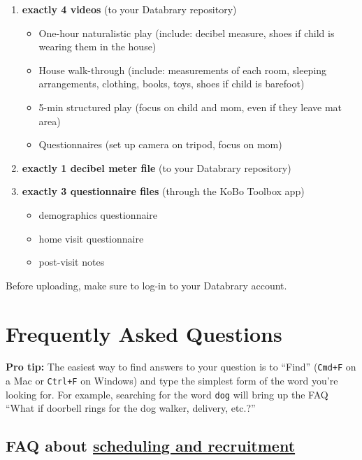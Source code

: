 \documentclass[
  12pt,
]{book}
\providecommand{\tightlist}{%
  \setlength{\itemsep}{0pt}\setlength{\parskip}{0pt}}
\begin{document}
\begin{enumerate}
\def\labelenumi{\arabic{enumi}.}
\tightlist
\item
  \textbf{exactly 4 videos} (to your Databrary repository)

  \begin{itemize}
  \tightlist
  \item
    One-hour naturalistic play (include: decibel measure, shoes if child is wearing them in the house)
  \item
    House walk-through (include: measurements of each room, sleeping arrangements, clothing, books, toys, shoes if child is barefoot)
  \item
    5-min structured play (focus on child and mom, even if they leave mat area)
  \item
    Questionnaires (set up camera on tripod, focus on mom)
  \end{itemize}
\item
  \textbf{exactly 1 decibel meter file} (to your Databrary repository)
\item
  \textbf{exactly 3 questionnaire files} (through the KoBo Toolbox app)

  \begin{itemize}
  \tightlist
  \item
    demographics questionnaire
  \item
    home visit questionnaire
  \item
    post-visit notes
  \end{itemize}
\end{enumerate}

Before uploading, make sure to log-in to your Databrary account.

\hypertarget{frequently-asked-questions}{%
\chapter{Frequently Asked Questions}\label{frequently-asked-questions}}

\textbf{Pro tip:} The easiest way to find answers to your question is to ``Find'' (\texttt{Cmd+F} on a Mac or \texttt{Ctrl+F} on Windows) and type the simplest form of the word you're looking for. For example, searching for the word \texttt{dog} will bring up the FAQ ``What if doorbell rings for the dog walker, delivery, etc.?''

\hypertarget{faq-about-scheduling-and-recruitment}{%
\section{\texorpdfstring{FAQ about \protect\hyperlink{scheduling}{scheduling and recruitment}}{FAQ about scheduling and recruitment}}\label{faq-about-scheduling-and-recruitment}}
\end{document}
